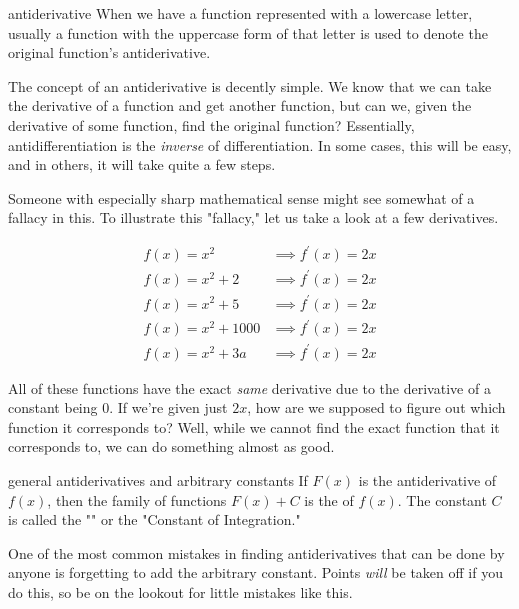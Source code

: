 \begin{notation}{antiderivative}
    When we have a function represented with a lowercase letter, usually a function with the uppercase form of that letter is used to denote the original function's antiderivative.
\end{notation}

The concept of an antiderivative is decently simple. We know that we can take the derivative of a function and get another function, but can we, given the derivative of some function, find the original function? Essentially, antidifferentiation is the \textit{inverse} of differentiation. In some cases, this will be easy, and in others, it will take quite a few steps.

Someone with especially sharp mathematical sense might see somewhat of a fallacy in this. To illustrate this "fallacy," let us take a look at a few derivatives.

\begin{align}
    f \left( x \right) = x^2 &\implies f^\prime \left( x \right) = 2x \\
    f \left( x \right) = x^2 + 2 &\implies f^\prime \left( x \right) = 2x \\
    f \left( x \right) = x^2 + 5 &\implies f^\prime \left( x \right) = 2x \\
    f \left( x \right) = x^2 + 1000 &\implies f^\prime \left( x \right) = 2x \\
    f \left( x \right) = x^2 + 3a &\implies f^\prime \left( x \right) = 2x
\end{align}

All of these functions have the exact \textit{same} derivative due to the derivative of a constant being \( 0 \). If we're given just \( 2x \), how are we supposed to figure out which function it corresponds to? Well, while we cannot find the exact function that it corresponds to, we can do something almost as good.

\begin{definition}{general antiderivatives and arbitrary constants}
If \( F \left( x \right) \) is the antiderivative of \( f \left( x \right) \), then the family of functions \( F \left( x \right) + C \) is the  of \( f \left( x \right) \). The constant \( C \) is called the "" or the "Constant of Integration."
\end{definition}

\begin{tip}
    One of the most common mistakes in finding antiderivatives that can be done by anyone is forgetting to add the arbitrary constant. Points \textit{will} be taken off if you do this, so be on the lookout for little mistakes like this.
\end{tip}


